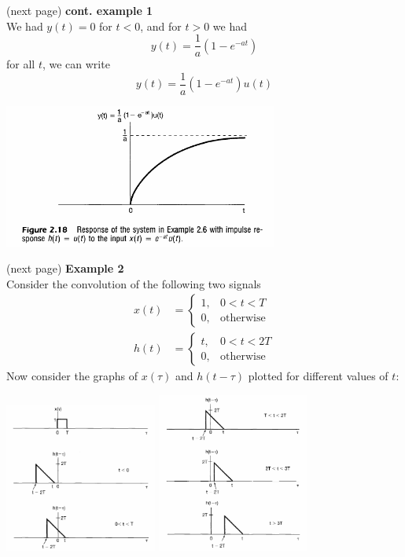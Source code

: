 \documentclass{report}
\begin{document}
(next page)\newpage
\noindent\textbf{cont. example 1}\\
We had $y(t)=0$ for $t<0$, and for $t>0$ we had
\begin{equation*}
y(t)=\frac{1}{a}(1-e^{-at})
\end{equation*}
for all $t$, we can write
\begin{equation*}
y(t)=\frac{1}{a}(1-e^{-at})u(t)
\end{equation*}
\begin{center}
\includegraphics[width=9cm]{a34}\\
\end{center}
(next page)\newpage
\noindent\textbf{Example 2}\\
Consider the convolution of the following two signals
\begin{align*}
x(t)&=\begin{cases}1,&0<t<T\\
0,&\text{otherwise}\end{cases}\\
h(t)&=\begin{cases}t,&0<t<2T\\
0,&\text{otherwise}\end{cases}
\end{align*}
Now consider the graphs of $x(\tau)$ and $h(t-\tau)$ plotted for different values of $t$:
\begin{center}
\includegraphics[width=5cm]{a35}
\includegraphics[width=5cm]{a36}
\end{center}
\end{document}
